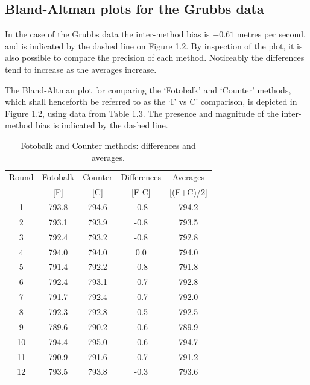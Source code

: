 \documentclass[12pt, a4paper]{report}
\begin{document}
	\subsection{Bland-Altman plots for the Grubbs data}
	
	In the case of the Grubbs data the inter-method bias is $-0.61$ metres per second, and is indicated by the dashed line on Figure 1.2. By inspection of the plot, it is also possible to compare the precision of each method. Noticeably the differences tend to increase as the averages increase.
	
	
	The Bland-Altman plot for comparing the `Fotobalk' and `Counter'
	methods, which shall henceforth be referred to as the `F vs C'
	comparison,  is depicted in Figure 1.2, using data from Table 1.3.
	The presence and magnitude of the inter-method bias is indicated
	by the dashed line.
	\newpage
	
	
	
	\begin{table}[h!]
		\renewcommand\arraystretch{0.7}%
		\begin{center}
			\begin{tabular}{|c||c|c||c|c|}
				\hline
				Round & Fotobalk  & Counter  & Differences  & Averages  \\
				&  [F] & [C] & [F-C] &  [(F+C)/2] \\
				\hline
				1 & 793.8 & 794.6 & -0.8 & 794.2 \\
				2 & 793.1 & 793.9 & -0.8 & 793.5 \\
				3 & 792.4 & 793.2 & -0.8 & 792.8 \\
				4 & 794.0 & 794.0 & 0.0 & 794.0 \\
				5 & 791.4 & 792.2 & -0.8 & 791.8 \\
				6 & 792.4 & 793.1 & -0.7 & 792.8 \\
				7 & 791.7 & 792.4 & -0.7 & 792.0 \\
				8 & 792.3 & 792.8 & -0.5 & 792.5 \\
				9 & 789.6 & 790.2 & -0.6 & 789.9 \\
				10 & 794.4 & 795.0 & -0.6 & 794.7 \\
				11 & 790.9 & 791.6 & -0.7 & 791.2 \\
				12 & 793.5 & 793.8 & -0.3 & 793.6 \\
				\hline
			\end{tabular}
			\caption{Fotobalk and Counter methods: differences and averages.}
		\end{center}
	\end{table}
	
\end{document}
